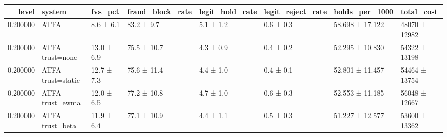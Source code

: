 \begin{tabular}{rlllllll}
\toprule
level & system & fvs\_pct & fraud\_block\_rate & legit\_hold\_rate & legit\_reject\_rate & holds\_per\_1000 & total\_cost \\
\midrule
0.200000 & ATFA & 8.6 ± 6.1 & 83.2 ± 9.7 & 5.1 ± 1.2 & 0.6 ± 0.3 & 58.698 ± 17.122 & 48070 ± 12982 \\
0.200000 & ATFA trust=none & 13.0 ± 6.9 & 75.5 ± 10.7 & 4.3 ± 0.9 & 0.4 ± 0.2 & 52.295 ± 10.830 & 54322 ± 13198 \\
0.200000 & ATFA trust=static & 12.7 ± 7.3 & 75.6 ± 11.4 & 4.4 ± 1.0 & 0.4 ± 0.1 & 52.801 ± 11.457 & 54464 ± 13754 \\
0.200000 & ATFA trust=ewma & 12.0 ± 6.5 & 77.2 ± 10.8 & 4.7 ± 1.0 & 0.6 ± 0.3 & 52.553 ± 11.185 & 56048 ± 12667 \\
0.200000 & ATFA trust=beta & 11.9 ± 6.4 & 77.1 ± 10.9 & 4.4 ± 1.1 & 0.5 ± 0.3 & 51.227 ± 12.577 & 53600 ± 13362 \\
\bottomrule
\end{tabular}
